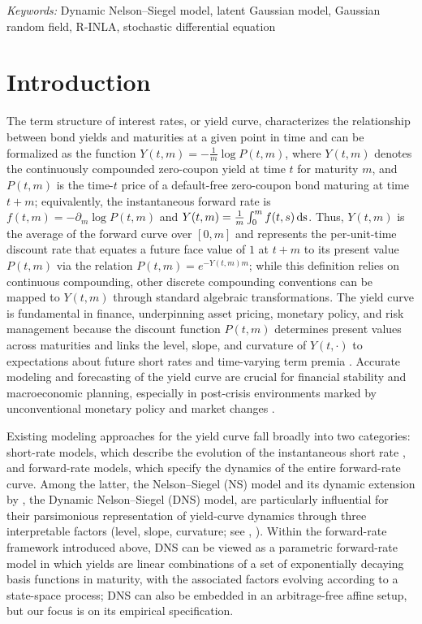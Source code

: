 \documentclass[
  12pt]{article}
\newcommand{\citeay}[1]{\citeauthor{#1}, \citeyear{#1}}
\begin{document}
\noindent%
{\it Keywords:} Dynamic Nelson–Siegel model, latent Gaussian model, Gaussian random field, R-INLA, stochastic differential equation
\vfill

\newpage
{} %

\section{Introduction}

The term structure of interest rates, or yield curve, characterizes the relationship between bond yields and maturities at a given point in time and can be formalized as the function $Y(t,m) = -\tfrac{1}{m}\log P(t,m)$, where $Y(t,m)$ denotes the continuously compounded zero-coupon yield at time $t$ for maturity $m$, and $P(t,m)$ is the time-$t$ price of a default-free zero-coupon bond maturing at time $t+m$; equivalently, the instantaneous forward rate is $f(t,m) = -\partial_m \log P(t,m)$ and $Y(t,m) = \tfrac{1}{m}\int_0^{m} f(t,s)\,\rm{d}s$. Thus, $Y(t,m)$ is the average of the forward curve over $[0,m]$ and represents the per-unit-time discount rate that equates a future face value of $1$ at $t+m$ to its present value $P(t,m)$ via the relation $P(t,m) = e^{-Y(t,m)m}$; while this definition relies on continuous compounding, other discrete compounding conventions can be mapped to $Y(t,m)$ through standard algebraic transformations. The yield curve is fundamental in finance, underpinning asset pricing, monetary policy, and risk management because the discount function $P(t,m)$ determines present values across maturities and links the level, slope, and curvature of $Y(t,\cdot)$ to expectations about future short rates \citep{campbell1991yield} and time-varying term premia \citep{fama1987information}. Accurate modeling and forecasting of the yield curve are crucial for financial stability and macroeconomic planning, especially in post-crisis environments marked by unconventional monetary policy and market changes \citep{zhuang2021statistical, congedi2025term, opschoor2025smooth}.

Existing modeling approaches for the yield curve fall broadly into two categories: short-rate models, which describe the evolution of the instantaneous short rate \citep{vasicek1977equilibrium}, and forward-rate models, which specify the dynamics of the entire forward-rate curve. Among the latter, the Nelson--Siegel (NS) model \citep{nelson1987parsimonious} and its dynamic extension by \cite{diebold2006forecasting}, the Dynamic Nelson--Siegel (DNS) model, are particularly influential for their parsimonious representation of yield-curve dynamics through three interpretable factors (level, slope, curvature; see \citeay{diebold2006macroeconomy}). Within the forward-rate framework introduced above, DNS can be viewed as a parametric forward-rate model in which yields are linear combinations of a set of exponentially decaying basis functions in maturity, with the associated factors evolving according to a state-space process; DNS can also be embedded in an arbitrage-free affine setup, but our focus is on its empirical specification.
\end{document}
